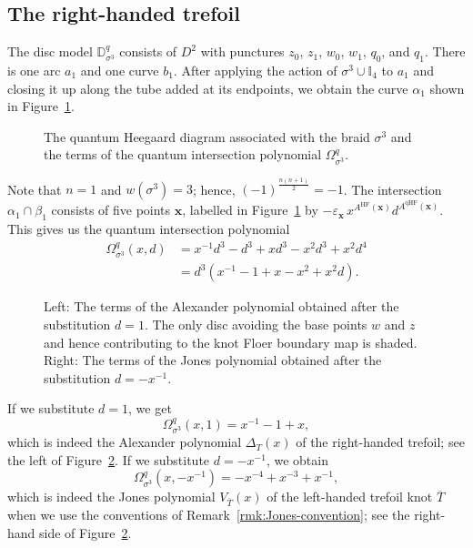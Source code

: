 \documentclass[11pt]{amsart}
\numberwithin{equation}{section}
\numberwithin{figure}{section}
\theoremstyle{definition}
\newcommand{\bD}{\mathbb{D}}
\newcommand{\bI}{\mathbb{I}}
\DeclareMathOperator{\qHF}{qHF}
\DeclareMathOperator{\HF}{HF}
\newcommand{\xs}{\boldsymbol{x}}
\begin{document}
\subsection{The right-handed trefoil}
The disc model $\bD_{\sigma^3}^q$ consists of $D^2$ with punctures $z_0$, $z_1$, $w_0$, $w_1$, $q_0$, and $q_1$. There is one arc $a_1$ and one curve $b_1$. After applying the action of $\sigma^3 \cup \bI_4$ to $a_1$ and closing it up along the tube added at its endpoints, we obtain the curve $\alpha_1$ shown in Figure~\ref{fig:trefoil}.

\begin{figure}
\centering
\def\svgwidth{1.3\textwidth}

\caption{The quantum Heegaard diagram associated with the braid $\sigma^3$ and the terms of the quantum intersection polynomial $\Omega^q_{\sigma^3}$.}\label{fig:trefoil}
\end{figure}

Note that $n = 1$ and $w(\sigma^3)=3$; hence, $(-1)^\frac{n(n+1)}{2} = -1$. The intersection $\alpha_1 \cap \beta_1$ consists of five points $\xs$, labelled in Figure~\ref{fig:trefoil} by $-\varepsilon_{\xs} \, x^{A^{\HF}(\xs)} d^{A^{\qHF}(\xs)}$. This gives us the quantum intersection polynomial
\begin{equation}
\begin{split}
\Omega^q_{\sigma^{3}}(x,d) &= x^{-1}d^3 - d^3 + xd^3 - x^2d^3 + x^2d^4 \\
&= d^3 \left(x^{-1} - 1 + x -x^2 + x^2d\right).
\end{split}
\end{equation}

\begin{figure}
\centering
\def\svgwidth{\textwidth}

\caption{Left: The terms of the Alexander polynomial obtained after the substitution $d=1$. The only disc avoiding the base points $w$ and $z$ and hence contributing to the knot Floer boundary map is shaded. Right: The terms of the Jones polynomial obtained after the substitution $d=-x^{-1}$.}
\label{fig:trefoil-Alexander-Jones}
\end{figure}

If we substitute $d=1$, we get
\begin{equation}
\Omega^q_{\sigma^3}(x,1) = x^{-1}-1+x,
\end{equation}
which is indeed the Alexander polynomial $\Delta_T(x)$ of the right-handed trefoil; see the left of Figure~\ref{fig:trefoil-Alexander-Jones}. If we substitute $d=-x^{-1}$, we obtain
\begin{equation}
\Omega^q_{\sigma^3}(x,-x^{-1})= -x^{-4}+x^{-3}+x^{-1},
\end{equation}
which is indeed the Jones polynomial $V_{\overline{T}}(x)$ of the left-handed trefoil knot $\overline{T}$ when we use the conventions of Remark~\ref{rmk:Jones-convention}; see the right-hand side of Figure~\ref{fig:trefoil-Alexander-Jones}.
\end{document}
